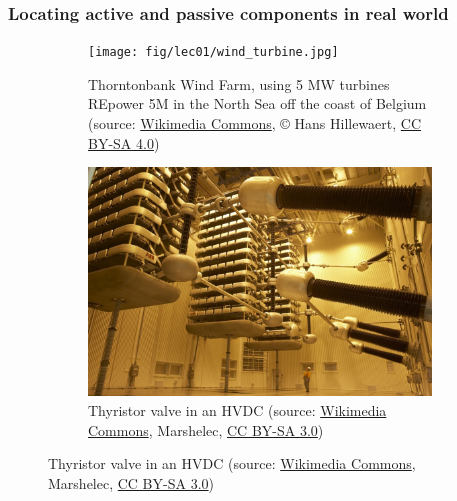 \begin{frame}
	\frametitle{Locating active and passive components in real world}
	\begin{figure}
		\centering
		\begin{subfigure}[t]{0.4\textwidth}
			\centering
			\texttt{[image: fig/lec01/wind\_turbine.jpg]}
			\caption{Thorntonbank Wind Farm, using 5 MW turbines REpower 5M in the North Sea off the coast of Belgium (source: \href{https://en.wikipedia.org/wiki/File:Windmills_D1-D4_(Thornton_Bank).jpg}{Wikimedia Commons}, © Hans Hillewaert, \href{https://creativecommons.org/licenses/by-sa/4.0/}{CC BY-SA 4.0})}
		\end{subfigure}
		\begin{subfigure}[t]{0.4\textwidth}
			\centering
			\includegraphics[scale=0.5]{fig/lec01/Thyristor.jpg}
			\caption{Thyristor valve in an HVDC (source: \href{https://commons.wikimedia.org/wiki/File:Pole_2_Thyristor_Valve.jpg}{Wikimedia Commons}, Marshelec, \href{https://creativecommons.org/licenses/by-sa/3.0}{CC BY-SA 3.0})}
		\end{subfigure}
	\end{figure}
\end{frame}


